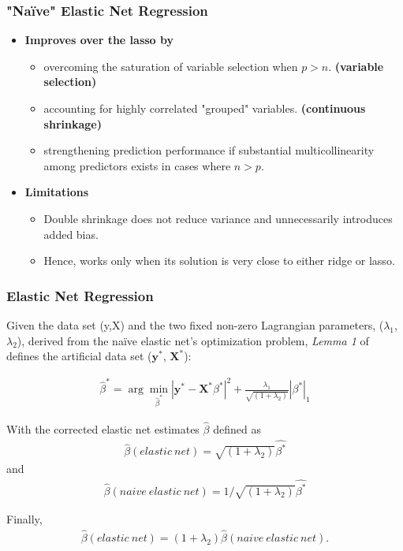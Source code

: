 \begin{frame}[fragile]
    \frametitle{"Naïve" Elastic Net Regression}
    \begin{itemize}
        \item \textbf{Improves over the lasso by}
            \begin{itemize}
                \item overcoming the saturation of variable selection when $p > n$. \textbf{(variable selection)}
                \item accounting for highly correlated "grouped" variables. \textbf{(continuous shrinkage)}
                \item strengthening prediction performance if substantial multicollinearity among predictors exists in cases where $n > p$.
            \end{itemize}
        \item \textbf{Limitations}
            \begin{itemize}
                \item Double shrinkage does not reduce variance and unnecessarily introduces added bias.
                \item Hence, works only when its solution is very close to either ridge or lasso.
            \end{itemize}
    \end{itemize}
\end{frame}
\begin{frame}[fragile]
    \frametitle{Elastic Net Regression}
    Given the data set (y,X) and the two fixed non-zero Lagrangian parameters, ($\lambda_{1}$,$\lambda_{2}$), derived from the naïve elastic net's optimization problem, \emph{Lemma 1} of \cite{zou2005regularization} defines the artificial data set ($\mathbf{y}^*$, $\mathbf{X}^*$): 
    
    \begin{align}
        \label{eqn:eqn7}
            \hat{\beta}^*=\arg \min_{\hat{\beta}^*}|\mathbf{y}^* - \mathbf{X}^*\beta^*|^2 + \frac{\lambda_1}{\sqrt{(1+\lambda_2)}}|\beta^*|_{1}
    \end{align}
    
    With the corrected elastic net estimates $\hat{\beta}$ defined as 
    \begin{align}
            \hat{\beta}(elastic \: net)=\sqrt{(1+\lambda_2)}\hat{\beta^*}
    \end{align}
    and 
    \begin{align}
            \hat{\beta}(naive \: elastic \: net)={1 / \sqrt{(1+\lambda_2)}}\hat{\beta^*}
    \end{align}
    
    Finally,
    \begin{align}
        \label{eqn:eqn10}
            \hat{\beta}(elastic \: net)=(1+\lambda_2)\hat{\beta}(naive \: elastic \: net). 
    \end{align}
\end{frame}
